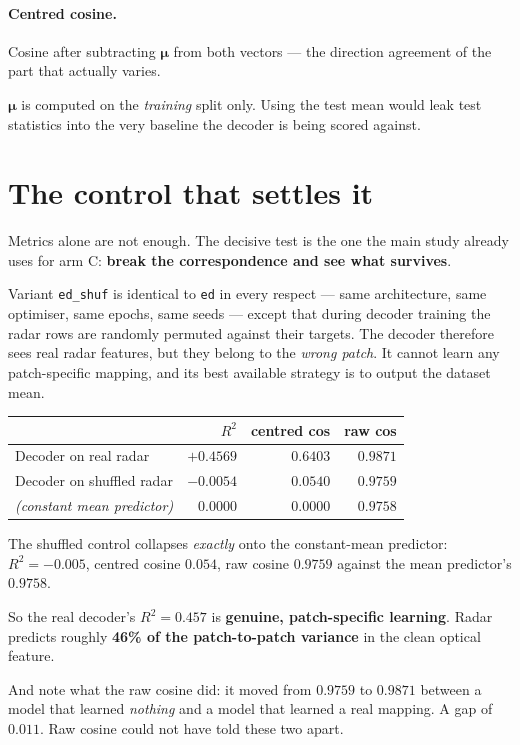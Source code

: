\documentclass[11pt,a4paper]{report}
\newcommand{\code}[1]{\texttt{\small #1}}
\begin{document}
\paragraph{Centred cosine.} Cosine after subtracting $\boldsymbol\mu$ from both
vectors --- the direction agreement of the part that actually varies.

\begin{flagbox}
$\boldsymbol\mu$ is computed on the \emph{training} split only. Using the test
mean would leak test statistics into the very baseline the decoder is being
scored against.
\end{flagbox}

\section{The control that settles it}

Metrics alone are not enough. The decisive test is the one the main study
already uses for arm C: \textbf{break the correspondence and see what survives}.

\begin{codedoes}
Variant \code{ed\_shuf} is identical to \code{ed} in every respect --- same
architecture, same optimiser, same epochs, same seeds --- except that during
decoder training the radar rows are randomly permuted against their targets. The
decoder therefore sees real radar features, but they belong to the \emph{wrong
patch}. It cannot learn any patch-specific mapping, and its best available
strategy is to output the dataset mean.
\end{codedoes}

\begin{center}
\small
\begin{tabular}{@{}lrrr@{}}
\toprule
& $R^2$ & \textbf{centred cos} & \textbf{raw cos} \\
\midrule
Decoder on real radar     & $+0.4569$ & $0.6403$ & $0.9871$ \\
Decoder on shuffled radar & $-0.0054$ & $0.0540$ & $0.9759$ \\
\midrule
\emph{(constant mean predictor)} & $0.0000$ & $0.0000$ & $0.9758$ \\
\bottomrule
\end{tabular}
\end{center}

\begin{keyfinding}
The shuffled control collapses \emph{exactly} onto the constant-mean predictor:
$R^2 = -0.005$, centred cosine $0.054$, raw cosine $0.9759$ against the mean
predictor's $0.9758$.

\medskip
So the real decoder's $R^2 = 0.457$ is \textbf{genuine, patch-specific learning}.
Radar predicts roughly \textbf{46\% of the patch-to-patch variance} in the clean
optical feature.

\medskip
And note what the raw cosine did: it moved from $0.9759$ to $0.9871$ between a
model that learned \emph{nothing} and a model that learned a real mapping. A gap
of $0.011$. Raw cosine could not have told these two apart.
\end{keyfinding}
\end{document}
